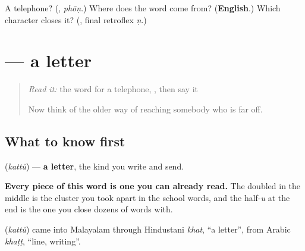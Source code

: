 \begin{tcolorbox}[breakable,colback=teal!4,colframe=teal!35!black,title={Before you move on}]
A telephone? (\textbf{}, \emph{phōṇ}.) Where does the word come from? (\textbf{English}.) Which character closes it? (\textbf{}, final retroflex \emph{ṇ}.)
\end{tcolorbox}
\section[\texorpdfstring{\ml{കത്ത്} (kattŭ)}{കത്ത് (kattŭ)}]{ — a letter}

\label{lesson:ML-C110-kattu}



\begin{quote}
\emph{Read it:} the word for a telephone, \textbf{}, then say it

Now think of the older way of reaching somebody who is far off.
\end{quote}

\subsection*{What to know first}
\textbf{} (\emph{kattŭ}) — \textbf{a letter}, the kind you write and send.

\textbf{Every piece of this word is one you can already read.} The doubled \textbf{} in the middle is the cluster you took apart in the school words, and the half-\emph{u} at the end is the one you close dozens of words with.

\begin{cousinweb}
\textbf{} (\emph{kattŭ}) came into Malayalam through Hindustani \emph{khat}, \textquotedblleft{}a letter\textquotedblright{}, from Arabic \emph{khaṭṭ}, \textquotedblleft{}line, writing\textquotedblright{}.
\end{cousinweb}

